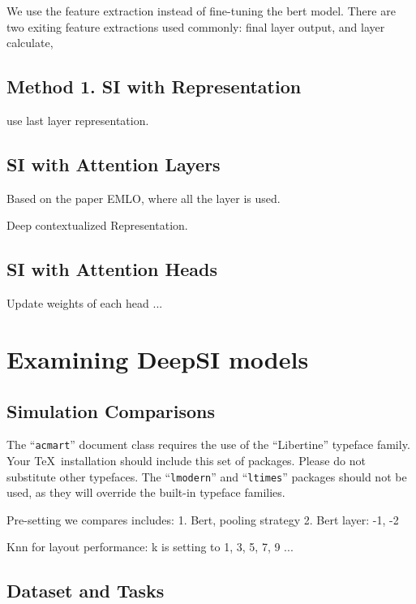 \documentclass[manuscript,screen]{acmart}
\begin{document}
We use the feature extraction instead of fine-tuning the bert model. 
There are two exiting feature extractions used commonly: final layer output, and layer calculate, 



\subsection{Method 1. SI with Representation}

use last layer representation.


\subsection{SI with Attention Layers}
Based on the paper EMLO, where all the layer is used. 

Deep contextualized Representation. 



\subsection{SI with Attention Heads}

Update weights of each head ...


\section{Examining DeepSI models}


\subsection{Simulation Comparisons}
The ``\verb|acmart|'' document class requires the use of the
``Libertine'' typeface family. Your \TeX\ installation should include
this set of packages. Please do not substitute other typefaces. The
``\verb|lmodern|'' and ``\verb|ltimes|'' packages should not be used,
as they will override the built-in typeface families.



Pre-setting we compares includes: 
1. Bert, pooling strategy 
2. Bert layer: -1, -2 





Knn for layout performance: 
k is setting to 1, 3, 5, 7, 9 ... 




\subsection{Dataset and Tasks}
\end{document}
